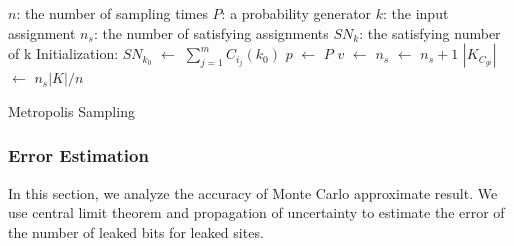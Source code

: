 \IncMargin{1em}
\begin{algorithm}
\SetAlgoLined
\DontPrintSemicolon


$n$: the number of sampling times \;
$P$: a probability generator \;
$k$: the input assignment \;
$n_{s}$: the number of satisfying assignments \;
$SN_k$: the satisfying number of k \; 
Initialization: \;
$SN_{k_0}$ $\leftarrow$ $\sum_{j=1}^{m}C_{i_j}(k_0)$ \;
 {
      $p$ $\leftarrow$ $P$ \;
      {
        $v$ $\leftarrow$  {}
      }
      {$n_{s}$ $\leftarrow$ $n_{s} + 1$}
}
$|K_{C_{gi}}|$ $\leftarrow$ $n_s|K| / n$
\caption{Metropolis Sampling}
\end{algorithm}
\DecMargin{1em}

\subsubsection{Error Estimation}
In this section, we analyze the accuracy of Monte Carlo approximate
result. We use central limit theorem and propagation of uncertainty 
to estimate the error of the number of leaked bits for leaked sites.
